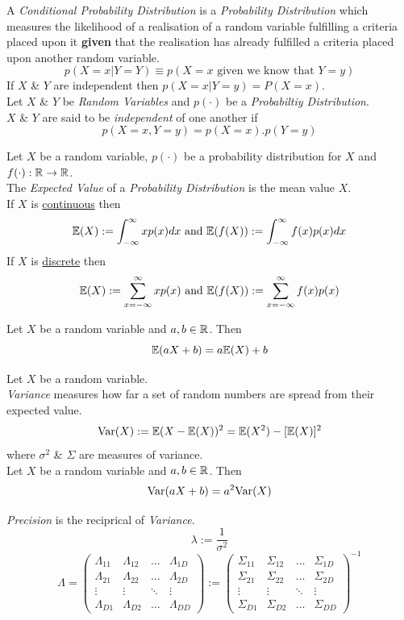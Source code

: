 \documentclass[11pt,a4paper]{article}
\begin{document}
A \textit{Conditional Probability Distribution} is a \textit{Probability Distribution} which measures the likelihood of a realisation of a random variable fulfilling a criteria placed upon it \textbf{given} that the realisation has already fulfilled a criteria placed upon another random variable.
$$p(X=x|Y=Y)\equiv p(X=x\text{ given we know that }Y=y)$$
\nb If $X$ \& $Y$ are independent then $p(X=x|Y=y)=P(X=x)$.\\

Let $X$ \& $Y$ be \textit{Random Variables} and $p(\cdot)$ be a \textit{Probabiltiy Distribution}.\\
$X$ \& $Y$ are said to be \textit{independent} of one another if
$$p(X=x,Y=y)=p(X=x).p(Y=y)$$

Let $X$ be a random variable, $p(\cdot)$ be a probability distribution for $X$ and $f(\cdot):\mathbb{R}\to\mathbb{R}$.\\
The \textit{Expected Value} of a \textit{Probability Distribution} is the mean value $X$.\\
If $X$ is \underline{continuous} then
$$\mathbb{E}(X):=\int_{-\infty}^\infty xp(x)dx\text{ and }\mathbb{E}(f(X)):=\int_{-\infty}^\infty f(x)p(x)dx$$
If $X$ is \underline{discrete} then
$$\mathbb{E}(X):=\sum_{x=-\infty}^\infty xp(x)\text{ and }\mathbb{E}(f(X)):=\sum_{x=-\infty}^\infty f(x)p(x)$$

Let $X$ be a random variable and $a,b\in\mathbb{R}$. Then
$$\mathbb{E}(aX+b)=a\mathbb{E}(X)+b$$

Let $X$ be a random variable.\\
\textit{Variance} measures how far a set of random numbers are spread from their expected value.
$$\mathrm{Var}(X):=\mathbb{E}(X-\mathbb{E}(X))^2=\mathbb{E}(X^2)-[\mathbb{E}(X)]^2$$
where $\sigma^2$ \& $\Sigma$ are measures of variance.\\

Let $X$ be a random variable and $a,b\in\mathbb{R}$. Then
$$\mathrm{Var}(aX+b)=a^2\mathrm{Var}(X)$$

\textit{Precision} is the reciprical of \textit{Variance}.\\
$$\lambda:=\frac{1}{\sigma^2}$$
$$\Lambda=\begin{pmatrix}\Lambda_{11}&\Lambda_{12}&\dots&\Lambda_{1D}\\\Lambda_{21}&\Lambda_{22}&\dots&\Lambda_{2D}\\\vdots&\vdots&\ddots&\vdots\\\Lambda_{D1}&\Lambda_{D2}&\dots&\Lambda_{DD}\end{pmatrix}:=\begin{pmatrix}\Sigma_{11}&\Sigma_{12}&\dots&\Sigma_{1D}\\\Sigma_{21}&\Sigma_{22}&\dots&\Sigma_{2D}\\\vdots&\vdots&\ddots&\vdots\\\Sigma_{D1}&\Sigma_{D2}&\dots&\Sigma_{DD}\end{pmatrix}^{-1}$$
\end{document}
